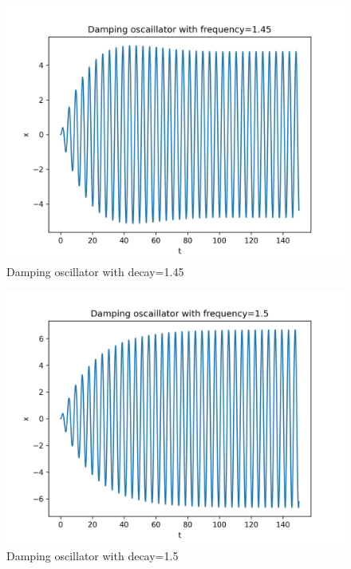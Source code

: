 \documentclass[11pt, a4paper]{article}
\begin{document}
\begin{figure}[!tbh]
\centering
\includegraphics[scale=0.65]{assgn7_plot4.png} 
\caption{Damping oscillator with decay=1.45}
\label{fig4}
\end{figure}

\begin{figure}[!tbh]
\centering
\includegraphics[scale=0.75]{assgn7_plot5.png} 
\caption{Damping oscillator with decay=1.5}
\label{fig5}
\end{figure}
\end{document}
